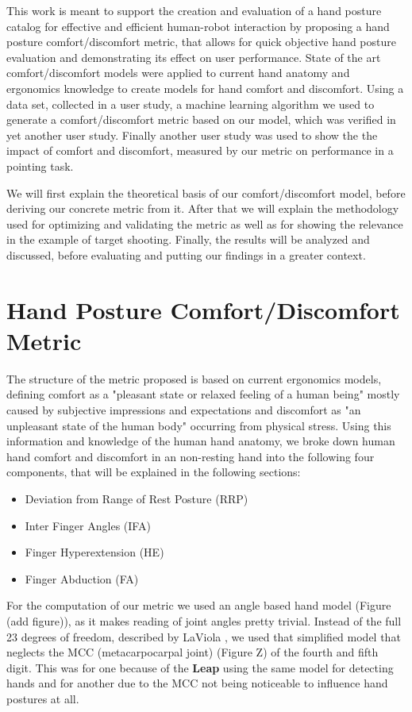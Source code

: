 \documentclass{sig-alternate-05-2015}
\begin{document}
This work is meant to support the creation and evaluation of a hand posture catalog for effective and efficient human-robot interaction by proposing a hand posture comfort/discomfort metric, that allows for quick objective hand posture evaluation and demonstrating its effect on user performance. State of the art comfort/discomfort models were applied to current hand anatomy and ergonomics knowledge to create models for hand comfort and discomfort. Using a data set, collected in a user study, a machine learning algorithm we used to generate a comfort/discomfort metric based on our model, which was verified in yet another user study. Finally another user study was used to show the the impact of comfort and discomfort, measured by our metric on performance in a pointing task.

We will first explain the theoretical basis of our comfort/discomfort model, before deriving our concrete metric from it. After that we will explain the methodology used for optimizing and validating the metric as well as for showing the relevance in the example of target shooting. Finally, the results will be analyzed and discussed, before evaluating and putting our findings in a greater context.


\section{Hand Posture Comfort/Discomfort Metric}
The structure of the metric proposed is based on current ergonomics models, defining comfort as a "pleasant state or relaxed feeling of a human being" mostly caused by subjective impressions and expectations and discomfort as "an unpleasant state of the human body" occurring from physical stress.\cite{vink2012editorial} Using this information and knowledge of the human hand anatomy, we broke down human hand comfort and discomfort in an non-resting hand into the following four components, that will be explained in the following sections: 

\begin{itemize}
	\item Deviation from Range of Rest Posture (RRP)
	\item Inter Finger Angles (IFA)
	\item Finger Hyperextension (HE)
	\item Finger Abduction (FA)
\end{itemize}

For the computation of our metric we used an angle based hand model \cite{su1994logical}(Figure (add figure)), as it makes reading of joint angles pretty trivial. Instead of the full 23 degrees of freedom, described by LaViola \cite{laviola1999survey}, we used that simplified model that neglects the MCC (metacarpocarpal joint) (Figure Z) of the fourth and fifth digit. This was for one because of the \textbf{Leap} using the same model for detecting hands and for another due to the MCC not being noticeable to influence hand postures at all.
\end{document}
